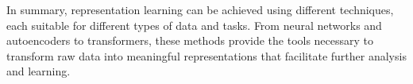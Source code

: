 In summary, representation learning can be achieved using different techniques, each suitable for different types of data and tasks. From neural networks and autoencoders to transformers, these methods provide the tools necessary to transform raw data into meaningful representations that facilitate further analysis and learning.


